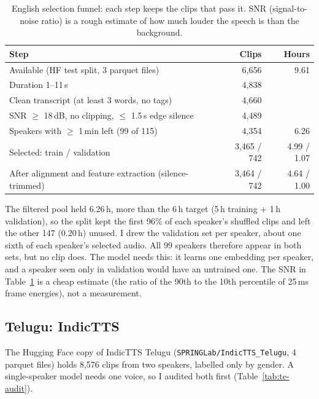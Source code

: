 \documentclass[11pt,a4paper]{article}
\newcommand{\code}[1]{\texttt{#1}}
\begin{document}
\begin{table}[H]\centering\small
\caption{English selection funnel: each step keeps the clips that pass it. SNR (signal-to-noise ratio) is a rough
estimate of how much louder the speech is than the background.}
\label{tab:en-funnel}
\begin{tabular}{@{}lrr@{}}
\toprule
Step & Clips & Hours \\
\midrule
Available (HF test split, 3 parquet files) & 6,656 & 9.61 \\
Duration 1--11\,s & 4,838 & \\
Clean transcript (at least 3 words, no tags) & 4,660 & \\
SNR $\geq$ 18\,dB, no clipping, $\leq$ 1.5\,s edge silence & 4,489 & \\
Speakers with $\geq$ 1\,min left (99 of 115) & 4,354 & 6.26 \\
\midrule
Selected: train / validation & 3,465 / 742 & 4.99 / 1.07 \\
After alignment and feature extraction (silence-trimmed) & 3,464 / 742 & 4.64 / 1.00 \\
\bottomrule
\end{tabular}
\end{table}

The filtered pool held 6.26\,h, more than the 6\,h target (5\,h training + 1\,h validation), so the split kept the first 96\% of each speaker's
shuffled clips and left the other 147 (0.20\,h) unused. I drew the validation set per speaker, about one sixth of
each speaker's selected audio. All 99 speakers therefore
appear in both sets, but no clip does. The model needs this: it learns one embedding per speaker, and a speaker
seen only in validation would have an untrained one. The SNR in Table~\ref{tab:en-funnel} is a cheap estimate (the
ratio of the 90th to the 10th percentile of 25\,ms frame energies), not a measurement.

\subsection{Telugu: IndicTTS}
The Hugging Face copy of IndicTTS Telugu (\code{SPRINGLab/IndicTTS\_Telugu}, 4 parquet files) holds 8,576 clips
from two speakers, labelled only by gender. A single-speaker model needs one voice, so I audited both first
(Table~\ref{tab:te-audit}).
\end{document}
